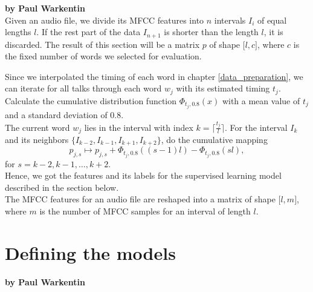 \textbf{by Paul Warkentin} \\

Given an audio file, we divide its MFCC features into $n$ intervals $I_i$ of equal lengths $l$. If the rest part of the data $I_{n+1}$ is shorter than the length $l$, it is discarded. The result of this section will be a matrix $p$ of shape $\lbrack l, c \rbrack$, where $c$ is the fixed number of words we selected for evaluation.

Since we interpolated the timing of each word in chapter \ref{data_preparation}, we can iterate for all talks through each word $w_j$ with its estimated timing $t_j$. Calculate the cumulative distribution function $\Phi_{t_j, 0.8}(x)$ with a mean value of $t_j$ and a standard deviation of 0.8. \\
The current word $w_j$ lies in the interval with index $k = \lceil \tfrac{t_j}{l} \rceil$. For the interval $I_k$ and its neighbors $\{I_{k-2}, I_{k-1}, I_{k+1}, I_{k+2}\}$, do the cumulative mapping
\[p_{j, s} \mapsto p_{j, s} + \Phi_{t_j, 0.8}((s - 1) l) - \Phi_{t_j, 0.8}(s l),\]
for $s = k-2, k-1, \dots, k+2$. \\

Hence, we got the features and its labels for the supervised learning model described in the section below. \\
The MFCC features for an audio file are reshaped into a matrix of shape $\lbrack l, m \rbrack$, where $m$ is the number of MFCC samples for an interval of length $l$.

\section{Defining the models}

\textbf{by Paul Warkentin} \\


